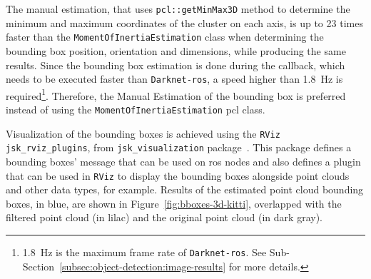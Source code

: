 The manual estimation, that uses \texttt{pcl::getMinMax3D} method to determine the minimum and maximum coordinates of the cluster on each axis, is up to 23 times faster than the \texttt{MomentOfInertiaEstimation} class when determining the bounding box position, orientation and dimensions, while producing the same results. Since the bounding box estimation is done during the callback, which needs to be executed faster than \texttt{Darknet-ros}, a speed higher than \SI{1.8}{\hertz} is required\footnote{\SI{1.8}{\hertz} is the maximum frame rate of \texttt{Darknet-ros}. See Sub-Section~\ref{subsec:object-detection:image-results} for more details.}. Therefore, the Manual Estimation of the bounding box is preferred instead of using the \texttt{MomentOfInertiaEstimation} \ac{pcl} class.

Visualization of the bounding boxes is achieved using the \texttt{RViz} \texttt{jsk\_rviz\_plugins}, from \texttt{jsk\_visualization} package~\cite{jsk_visualization}. This package defines a bounding boxes' message that can be used on \ac{ros} nodes and also defines a plugin that can be used in \texttt{RViz} to display the bounding boxes alongside point clouds and other data types, for example. Results of the estimated point cloud bounding boxes, in blue, are shown in Figure~\ref{fig:bboxes-3d-kitti}, overlapped with the filtered point cloud (in lilac) and the original point cloud (in dark gray).


